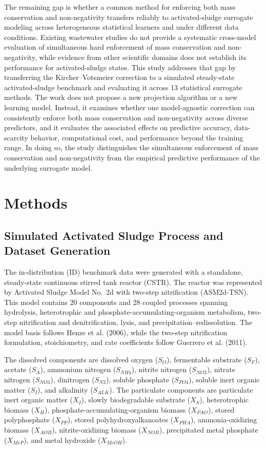 \documentclass[a4paper,fleqn]{cas-sc}
\begin{document}
The remaining gap is whether a common method for enforcing both mass conservation and non-negativity transfers reliably to activated-sludge surrogate modeling across heterogeneous statistical learners and under different data conditions. Existing wastewater studies do not provide a systematic cross-model evaluation of simultaneous hard enforcement of mass conservation and non-negativity, while evidence from other scientific domains does not establish its performance for activated-sludge states. This study addresses that gap by transferring the Kircher--Votsmeier correction to a simulated steady-state activated-sludge benchmark and evaluating it across 13 statistical surrogate methods. The work does not propose a new projection algorithm or a new learning model. Instead, it examines whether one model-agnostic correction can consistently enforce both mass conservation and non-negativity across diverse predictors, and it evaluates the associated effects on predictive accuracy, data-scarcity behavior, computational cost, and performance beyond the training range. In doing so, the study distinguishes the simultaneous enforcement of mass conservation and non-negativity from the empirical predictive performance of the underlying surrogate model.

\section{Methods}

\subsection{Simulated Activated Sludge Process and Dataset Generation}

The in-distribution (ID) benchmark data were generated with a standalone, steady-state continuous stirred tank reactor (CSTR). The reactor was represented by Activated Sludge Model No.\ 2d with two-step nitrification (ASM2d-TSN). This model contains 20 components and 28 coupled processes spanning hydrolysis, heterotrophic and phosphate-accumulating-organism metabolism, two-step nitrification and denitrification, lysis, and precipitation--redissolution. The model basis follows Henze et al. (2006), while the two-step nitrification formulation, stoichiometry, and rate coefficients follow Guerrero et al. (2011).

The dissolved components are dissolved oxygen ($S_O$), fermentable substrate ($S_F$), acetate ($S_A$), ammonium nitrogen ($S_{NH4}$), nitrite nitrogen ($S_{NO2}$), nitrate nitrogen ($S_{NO3}$), dinitrogen ($S_{N2}$), soluble phosphate ($S_{PO4}$), soluble inert organic matter ($S_I$), and alkalinity ($S_{ALK}$). The particulate components are particulate inert organic matter ($X_I$), slowly biodegradable substrate ($X_S$), heterotrophic biomass ($X_H$), phosphate-accumulating-organism biomass ($X_{PAO}$), stored polyphosphate ($X_{PP}$), stored polyhydroxyalkanoates ($X_{PHA}$), ammonia-oxidizing biomass ($X_{AOB}$), nitrite-oxidizing biomass ($X_{NOB}$), precipitated metal phosphate ($X_{MeP}$), and metal hydroxide ($X_{MeOH}$).
\end{document}
